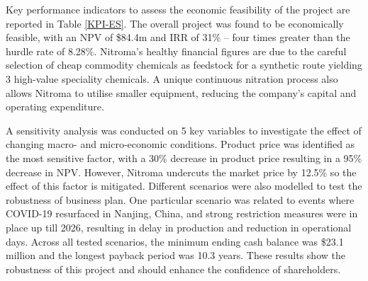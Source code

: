 Key performance indicators to assess the economic feasibility of the project are reported in Table \ref{KPI-ES}. The overall project was found to be economically feasible, with an NPV of \$84.4m and IRR of 31\% – four times greater than the hurdle rate of 8.28\%. Nitroma’s healthy financial figures are due to the careful selection of cheap commodity chemicals as feedstock for a synthetic route yielding 3 high-value speciality chemicals. A unique continuous nitration process also allows Nitroma to utilise smaller equipment, reducing the company’s capital and operating expenditure.

A sensitivity analysis was conducted on 5 key variables to investigate the effect of changing macro- and micro-economic conditions. Product price was identified as the most sensitive factor, with a 30\% decrease in product price resulting in a 95\% decrease in NPV. However, Nitroma undercuts the market price by 12.5\% so the effect of this factor is mitigated. Different scenarios were also modelled to test the robustness of business plan. One particular scenario was related to events where COVID-19 resurfaced in Nanjing, China, and strong restriction measures were in place up till 2026, resulting in delay in production and reduction in operational days. Across all tested scenarios, the minimum ending cash balance was \$23.1 million and the longest payback period was 10.3 years. These results show the robustness of this project and should enhance the confidence of shareholders.